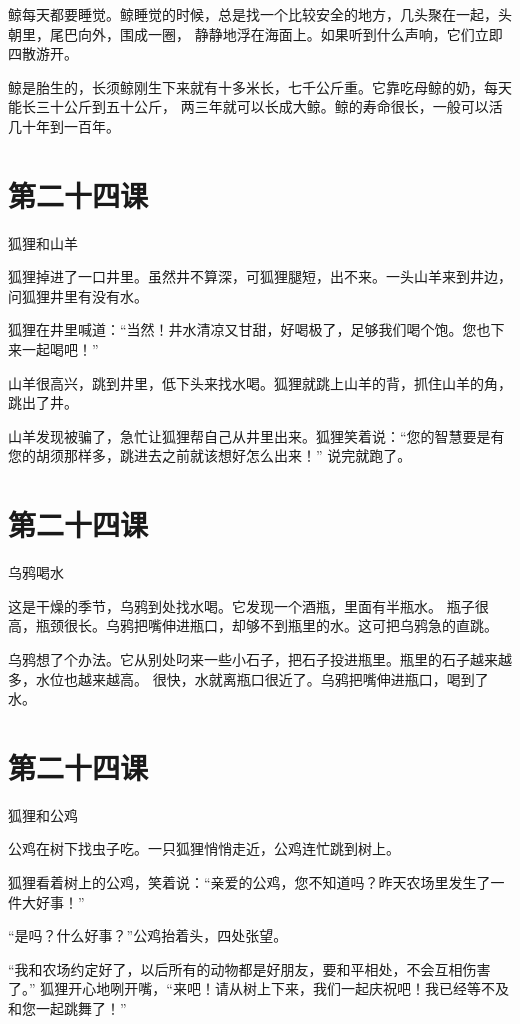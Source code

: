 \documentclass[12pt,UTF8]{ctexbook}
\begin{document}
鲸每天都要睡觉。鲸睡觉的时候，总是找一个比较安全的地方，几头聚在一起，头朝里，尾巴向外，围成一圈，
静静地浮在海面上。如果听到什么声响，它们立即四散游开。

鲸是胎生的，长须鲸刚生下来就有十多米长，七千公斤重。它靠吃母鲸的奶，每天能长三十公斤到五十公斤，
两三年就可以长成大鲸。鲸的寿命很长，一般可以活几十年到一百年。

\section{第二十四课}

狐狸和山羊

狐狸掉进了一口井里。虽然井不算深，可狐狸腿短，出不来。一头山羊来到井边，问狐狸井里有没有水。

狐狸在井里喊道：“当然！井水清凉又甘甜，好喝极了，足够我们喝个饱。您也下来一起喝吧！”

山羊很高兴，跳到井里，低下头来找水喝。狐狸就跳上山羊的背，抓住山羊的角，跳出了井。

山羊发现被骗了，急忙让狐狸帮自己从井里出来。狐狸笑着说：“您的智慧要是有您的胡须那样多，跳进去之前就该想好怎么出来！”
说完就跑了。

\section{第二十四课}

乌鸦喝水

这是干燥的季节，乌鸦到处找水喝。它发现一个酒瓶，里面有半瓶水。
瓶子很高，瓶颈很长。乌鸦把嘴伸进瓶口，却够不到瓶里的水。这可把乌鸦急的直跳。

乌鸦想了个办法。它从别处叼来一些小石子，把石子投进瓶里。瓶里的石子越来越多，水位也越来越高。
很快，水就离瓶口很近了。乌鸦把嘴伸进瓶口，喝到了水。

\section{第二十四课}

狐狸和公鸡

公鸡在树下找虫子吃。一只狐狸悄悄走近，公鸡连忙跳到树上。

狐狸看着树上的公鸡，笑着说：“亲爱的公鸡，您不知道吗？昨天农场里发生了一件大好事！”

“是吗？什么好事？”公鸡抬着头，四处张望。

“我和农场约定好了，以后所有的动物都是好朋友，要和平相处，不会互相伤害了。”
狐狸开心地咧开嘴，“来吧！请从树上下来，我们一起庆祝吧！我已经等不及和您一起跳舞了！”
\end{document}
